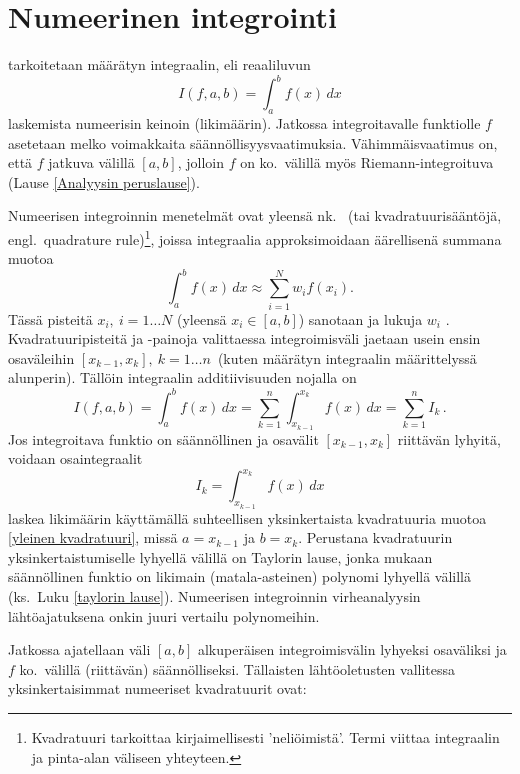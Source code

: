 \section{Numeerinen integrointi} \label{numeerinen integrointi}
\alku
{}

 tarkoitetaan määrätyn integraalin, eli reaaliluvun
\[
I(f,a,b)=\int_a^b f(x)\,dx
\]
laskemista numeerisin keinoin (likimäärin). Jatkossa integroitavalle funktiolle $f$ asetetaan
melko voimakkaita säännöllisyysvaatimuksia. Vähimmäisvaatimus on, että $f$ jatkuva välillä
$[a,b]$, jolloin $f$ on ko.\ välillä myös Riemann-integroituva
(Lause \ref{Analyysin peruslause}).

Numeerisen integroinnin menetelmät ovat yleensä nk.\
(tai kvadratuurisääntöjä, engl.\ quadrature rule)\footnote[2]{Kvadratuuri tarkoittaa
kirjaimellisesti 'neliöimistä'. Termi viittaa integraalin ja pinta-alan väliseen yhteyteen.},
joissa integraalia approksimoidaan äärellisenä summana muotoa
\begin{equation} \label{yleinen kvadratuuri}
\int_a^b f(x)\,dx\approx\sum_{i=1}^N w_i f(x_i).
\end{equation}
%
Tässä pisteitä $x_i,\ i=1 \ldots N$ (yleensä $x_i\in[a,b]$) sanotaan 
ja lukuja $w_i$ \kor{kvadratuuripainoiksi}. Kvadratuuripisteitä ja -painoja valittaessa 
integroimisväli jaetaan usein ensin osaväleihin $[x_{k-1},x_k],\ k=1 \ldots n\,$ 
(kuten määrätyn integraalin määrittelyssä alunperin). Tällöin integraalin additiivisuuden
nojalla on
\begin{equation} \label{integraalin hajotelma}
I(f,a,b)=\int_a^b f(x)\,dx = \sum_{k=1}^n \int_{x_{k-1}}^{x_k} f(x)\,dx = \sum_{k=1}^n I_k\,.
\end{equation}
Jos integroitava funktio on säännöllinen ja osavälit $[x_{k-1},x_k]$ riittävän lyhyitä, voidaan
osaintegraalit
\[
I_k=\int_{x_{k-1}}^{x_k} f(x)\,dx
\]
laskea likimäärin käyttämällä suhteellisen yksinkertaista kvadratuuria muotoa 
\eqref{yleinen kvadratuuri}, missä $a=x_{k-1}$ ja $b=x_{k}$. Perustana kvadratuurin
yksinkertaistumiselle lyhyellä välillä on Taylorin lause, jonka mukaan säännöllinen funktio on
likimain (matala-asteinen) polynomi lyhyellä välillä (ks.\ Luku \ref{taylorin lause}). 
Numeerisen integroinnin virheanalyysin lähtöajatuksena onkin juuri vertailu polynomeihin.

Jatkossa ajatellaan väli $[a,b]$ alkuperäisen integroimisvälin lyhyeksi osaväliksi ja $f$ ko.\
välillä (riittävän) säännölliseksi. Tällaisten lähtöoletusten vallitessa yksinkertaisimmat
numeeriset kvadratuurit ovat:

